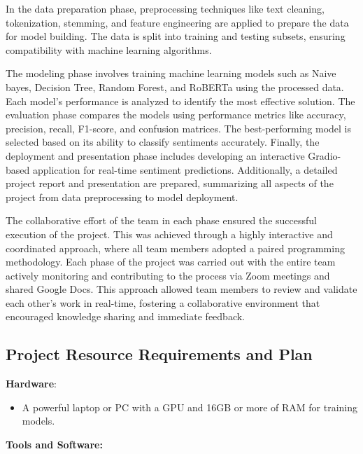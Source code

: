 \documentclass[journal]{IEEEtran}
\begin{document}
In the data preparation phase, preprocessing techniques like text cleaning, tokenization, stemming, and feature engineering are applied to prepare the data for model building. The data is split into training and testing subsets, ensuring compatibility with machine learning algorithms.

The modeling phase involves training machine learning models such as Naive bayes, Decision Tree, Random Forest, and RoBERTa using the processed data. Each model's performance is analyzed to identify the most effective solution.
The evaluation phase compares the models using performance metrics like accuracy, precision, recall, F1-score, and confusion matrices. The best-performing model is selected based on its ability to classify sentiments accurately.
Finally, the deployment and presentation phase includes developing an interactive Gradio-based application for real-time sentiment predictions. Additionally, a detailed project report and presentation are prepared, summarizing all aspects of the project from data preprocessing to model deployment.

The collaborative effort of the team in each phase ensured the successful execution of the project. This was achieved through a highly interactive and coordinated approach, where all team members adopted a paired programming methodology. Each phase of the project was carried out with the entire team actively monitoring and contributing to the process via Zoom meetings and shared Google Docs.
This approach allowed team members to review and validate each other’s work in real-time, fostering a collaborative environment that encouraged knowledge sharing and immediate feedback. 


\subsection{\textbf{Project Resource Requirements and Plan}}
\textbf{Hardware}: 

\begin{itemize}
    \item A powerful laptop or PC with a GPU and 16GB or more of RAM for training models.
\end{itemize}

\textbf{Tools and Software:}
\end{document}
